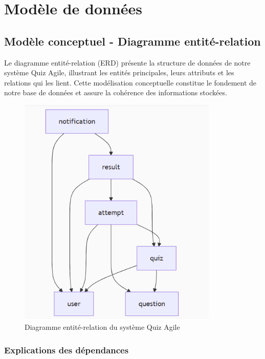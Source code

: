\documentclass[12pt,a4paper]{report}
\begin{document}
\section{Modèle de données}

\subsection{Modèle conceptuel - Diagramme entité-relation}

Le diagramme entité-relation (ERD) présente la structure de données de notre système Quiz Agile, illustrant les entités principales, leurs attributs et les relations qui les lient. Cette modélisation conceptuelle constitue le fondement de notre base de données et assure la cohérence des informations stockées.

\begin{figure}[htbp]
    \centering
    \includegraphics[width=0.85\textwidth]{latex_media/media/Diagramme entite-relation.png}
    \caption{Diagramme entité-relation du système Quiz Agile}
    \label{fig:erd-quiz-agile}
\end{figure}

\subsubsection{Explications des dépendances}
\end{document}
